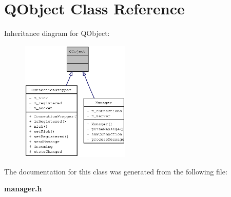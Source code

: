 \section{QObject Class Reference}
\label{classQObject}
Inheritance diagram for QObject:\nopagebreak
\begin{figure}[H]
\begin{center}
\leavevmode
\includegraphics[width=147pt]{classQObject__inherit__graph}
\end{center}
\end{figure}


The documentation for this class was generated from the following file:\begin{CompactItemize}
\item 
{\bf manager.h}\end{CompactItemize}
